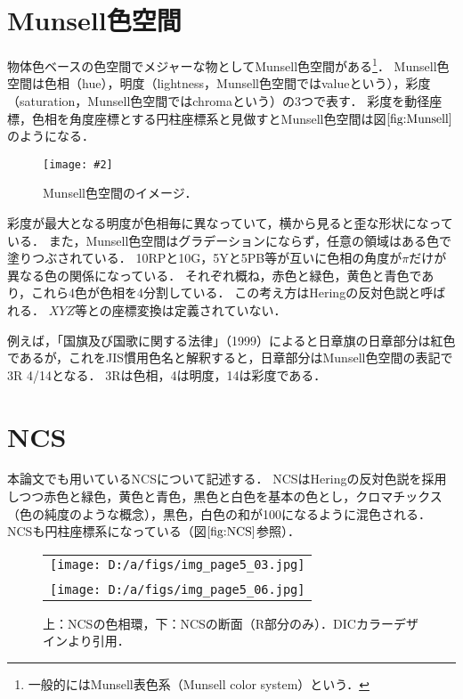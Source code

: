 \documentclass[uplatex,paper=a4,fontsize=4.0truemm,jafontsize=4.0truemm,head_space=30.0truemm,foot_space=30.0truemm,baselineskip=8.0truemm,line_length=40zw,gutter=25.0truemm,oneside,openany,fleqn,hanging_panctuation,open_bracket_pos=nibu_tentsuki,dvipdfmx,jis2004,book,titlepage]{jlreq}
\theoremstyle{mystyle}
\newcommand{\captiondot}[1]{\caption{#1．}}
\newcommand{\figureinput}[4]{\begin{figure}[btp]\centering\texttt{[image: \#2]}\captiondot{#3}\label{fig:#4}\end{figure}}
\newcommand{\mathdisplaystyle}[1]{\(\displaystyle{#1}\)}
\newcommand{\Reference}[1]{\mathdisplaystyle{\ref{#1}}}
\begin{document}
		\section{Munsell色空間}
			物体色ベースの色空間でメジャーな物としてMunsell色空間がある\footnote{一般的にはMunsell表色系（Munsell color system）という．}．
			Munsell色空間は色相（hue），明度（lightness，Munsell色空間ではvalueという），彩度（saturation，Munsell色空間ではchromaという）の3つで表す．
			彩度を動径座標，色相を角度座標とする円柱座標系と見做すとMunsell色空間は図\Reference{fig:Munsell}のようになる．
			\figureinput{width=5truecm}{D:/a/figs/munsell3.png}{Munsell色空間のイメージ\protect\cite{Fukue2010}}{Munsell}
			彩度が最大となる明度が色相毎に異なっていて，横から見ると歪な形状になっている．
			また，Munsell色空間はグラデーションにならず，任意の領域はある色で塗りつぶされている．
			10RPと10G，5Yと5PB等が互いに色相の角度が\mathdisplaystyle{\pi}だけが異なる色の関係になっている．
			それぞれ概ね，赤色と緑色，黄色と青色であり，これら4色が色相を4分割している．
			この考え方はHeringの反対色説と呼ばれる．
			\mathdisplaystyle{XYZ}等との座標変換は定義されていない．

			例えば，「国旗及び国歌に関する法律」（1999）によると日章旗の日章部分は紅色であるが，これをJIS慣用色名と解釈すると，日章部分はMunsell色空間の表記で3R 4/14となる．
			3Rは色相，4は明度，14は彩度である．
		\section{NCS}
			本論文でも用いているNCSについて記述する．
			NCSはHeringの反対色説を採用しつつ赤色と緑色，黄色と青色，黒色と白色を基本の色とし，クロマチックス（色の純度のような概念），黒色，白色の和が100になるように混色される．
			NCSも円柱座標系になっている（図\Reference{fig:NCS}参照）．
			\begin{figure}[tbp]
				\centering
				\begin{tabular}{c}
					\begin{minipage}{\linewidth}
						\centering
						\texttt{[image: D:/a/figs/img\_page5\_03.jpg]}
					\end{minipage} \\
					\begin{minipage}{0.06\linewidth}
						\vspace{10truemm}
					\end{minipage} \\
					\begin{minipage}{\linewidth}
						\centering
						\texttt{[image: D:/a/figs/img\_page5\_06.jpg]}
					\end{minipage}
				\end{tabular}
				\captiondot{上：NCSの色相環，下：NCSの断面（R部分のみ）．DICカラーデザイン\protect\cite{DIC2015}より引用}\label{fig:NCS}
			\end{figure}
\end{document}
